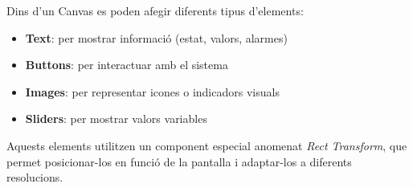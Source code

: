 \documentclass[12pt,a4paper]{report}
\begin{document}
Dins d'un Canvas es poden afegir diferents tipus d'elements:

\begin{itemize}
\item \textbf{Text}: per mostrar informació (estat, valors, alarmes)
\item \textbf{Buttons}: per interactuar amb el sistema
\item \textbf{Images}: per representar icones o indicadors visuals
\item \textbf{Sliders}: per mostrar valors variables
\end{itemize}

Aquests elements utilitzen un component especial anomenat \textit{Rect Transform}, que permet posicionar-los en funció de la pantalla i adaptar-los a diferents resolucions. 
\end{document}
